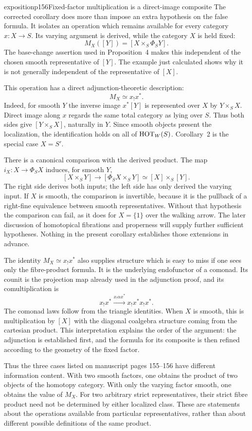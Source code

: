 \begin{dcomment}{exposition}{p156}{Fixed-factor multiplication is a direct-image composite}
The corrected corollary does more than impose an extra hypothesis on the false formula. It isolates an operation which remains available for every category $x:X\longrightarrow S$. Its varying argument is derived, while the category $X$ is held fixed:
\[
 M_X([Y])=[X\times_S\Phi_SY].
\]
The base-change assertion used in Proposition~4 makes this independent of the chosen smooth representative of $[Y]$. The example just calculated shows why it is not generally independent of the representative of $[X]$.

This operation has a direct adjunction-theoretic description:
\[
 M_X\simeq x_!x^*.
\]
Indeed, for smooth $Y$ the inverse image $x^*[Y]$ is represented over $X$ by $Y\times_SX$. Direct image along $x$ regards the same total category as lying over $S$. Thus both sides give $[Y\times_SX]$, naturally in $Y$. Since smooth objects present the localization, the identification holds on all of $\mathrm{HOT}_W(S)$. Corollary~2 is the special case $X=S'$.

There is a canonical comparison with the derived product. The map $i_X:X\longrightarrow\Phi_SX$ induces, for smooth $Y$,
\[
 [X\times_SY]\longrightarrow[\Phi_SX\times_SY]
 \simeq[X]\times_S[Y].
\]
The right side derives both inputs; the left side has only derived the varying input. If $X$ is smooth, the comparison is invertible, because it is the pullback of a right-fine equivalence between smooth representatives. Without that hypothesis the comparison can fail, as it does for $X=\{1\}$ over the walking arrow. The later discussion of homotopical fibrations and properness will supply further sufficient hypotheses. Nothing in the present corollary establishes those extensions in advance.

The identity $M_X\simeq x_!x^*$ also supplies structure which is easy to miss if one sees only the fibre-product formula. It is the underlying endofunctor of a comonad. Its counit is the projection map already used in the adjunction proof, and its comultiplication is
\[
 x_!x^*\xrightarrow{x_!\alpha x^*}x_!x^*x_!x^*.
\]
The comonad laws follow from the triangle identities. When $X$ is smooth, this is multiplication by $[X]$ with the diagonal coalgebra structure coming from the cartesian product. This interpretation explains the order of the argument: the adjunction is established first, and the formula for its composite is then refined according to the geometry of the fixed factor.

Thus the three cases listed on manuscript pages 155--156 have different information content. With two smooth factors, one obtains the product of two objects of the homotopy category. With only the varying factor smooth, one obtains the value of $M_X$. For two arbitrary strict representatives, their strict fibre product need not be determined by either localized class. These are statements about the operations available from particular representatives, rather than about different possible definitions of the same product.
\end{dcomment}


